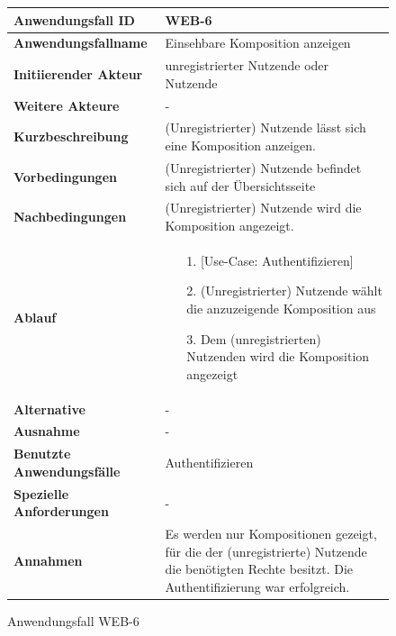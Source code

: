 \begin{figure}[h]
	\centering
	\begin{tabularx}{\textwidth}{ X | X }
		\textbf{Anwendungsfall ID} & WEB-6 \\ \hline
		\textbf{Anwendungsfallname} & Einsehbare Komposition anzeigen \\ \hline
		\textbf{Initiierender Akteur} & unregistrierter Nutzende oder Nutzende\\ \hline
		\textbf{Weitere Akteure} & - \\ \hline
		\textbf{Kurzbeschreibung} & (Unregistrierter) Nutzende  lässt sich eine Komposition anzeigen. \\ \hline
		\textbf{Vorbedingungen} & (Unregistrierter) Nutzende befindet sich auf der Übersichtsseite \\ \hline
		\textbf{Nachbedingungen} & (Unregistrierter) Nutzende wird die Komposition angezeigt. \\ \hline
		\textbf{Ablauf} &
		\begin{enumerate}
			\item[1.] [Use-Case: Authentifizieren]
			\item[2.] (Unregistrierter) Nutzende wählt die anzuzeigende Komposition aus
			\item[3.] Dem (unregistrierten) Nutzenden wird die Komposition angezeigt
		\end{enumerate} \\ \hline
		\textbf{Alternative} & - \\ \hline
		\textbf{Ausnahme} & - \\ \hline
		\textbf{Benutzte Anwendungsfälle} & Authentifizieren \\ \hline
		\textbf{Spezielle Anforderungen} & - \\ \hline
		\textbf{Annahmen} & Es werden nur Kompositionen gezeigt, für die der (unregistrierte) Nutzende die benötigten Rechte besitzt. Die Authentifizierung war erfolgreich.
	\end{tabularx}
	\caption{Anwendungsfall WEB-6}
	\label{fig:anwendungsfall-server-tabelle-web-6}
\end{figure}